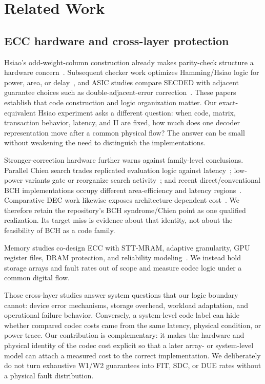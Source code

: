 \documentclass[conference,10pt]{IEEEtran}
\begin{document}
\section{Related Work}

\subsection{ECC hardware and cross-layer protection}

Hsiao's odd-weight-column construction already makes parity-check structure a hardware concern~\cite{hsiao1970}. Subsequent checker work optimizes Hamming/Hsiao logic for power, area, or delay~\cite{ghosh2004,reviriego2013}, and ASIC studies compare SECDED with adjacent guarantee choices such as double-adjacent-error correction~\cite{tripathi2020}. These papers establish that code construction and logic organization matter. Our exact-equivalent Hsiao experiment asks a different question: when code, matrix, transaction behavior, latency, and II are fixed, how much does one decoder representation move after a common physical flow? The answer can be small without weakening the need to distinguish the implementations.

Stronger-correction hardware further warns against family-level conclusions. Parallel Chien search trades replicated evaluation logic against latency~\cite{chen2004}; low-power variants gate or reorganize search activity~\cite{wong2011,yoo2016}; and recent direct/conventional BCH implementations occupy different area-efficiency and latency regions~\cite{lagendijk2026}. Comparative DEC work likewise exposes architecture-dependent cost~\cite{naseer2008,das2019}. We therefore retain the repository's BCH syndrome/Chien point as one qualified realization. Its target miss is evidence about that identity, not about the feasibility of BCH as a code family.

Memory studies co-design ECC with STT-MRAM, adaptive granularity, GPU register files, DRAM protection, and reliability modeling~\cite{delbel2014,pajouhi2015,nair2016,wei2020,lee2022,yoon2011}. We instead hold storage arrays and fault rates out of scope and measure codec logic under a common digital flow.

Those cross-layer studies answer system questions that our logic boundary cannot: device error mechanisms, storage overhead, workload adaptation, and operational failure behavior. Conversely, a system-level code label can hide whether compared codec costs came from the same latency, physical condition, or power trace. Our contribution is complementary: it makes the hardware and physical identity of the codec cost explicit so that a later array- or system-level model can attach a measured cost to the correct implementation. We deliberately do not turn exhaustive W1/W2 guarantees into FIT, SDC, or DUE rates without a physical fault distribution.
\end{document}
